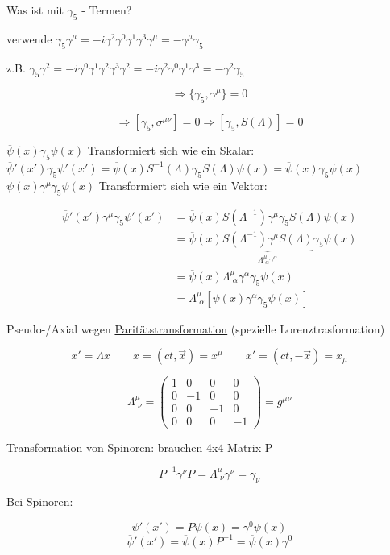 Was ist mit \(\gamma_5\) - Termen?

verwende \(\gamma_5\gamma^\mu =- i\gamma^2\gamma^0\gamma^1\gamma^3\gamma^\mu = -\gamma^\mu\gamma_5 \)

z.B. \(\gamma_5\gamma^2 = - i\gamma^0\gamma^1\gamma^2\gamma^3\gamma^2 = - i\gamma^2\gamma^0\gamma^1\gamma^3 = -\gamma^2\gamma_5 \)

\[\Rightarrow \{ \gamma_5,\gamma^\mu \} = 0\]

\[\Rightarrow [\gamma_5,\sigma^{\mu\nu}]=0 \Rightarrow [\gamma_5,S(\Lambda)]=0\]

\(\overline\psi(x)\gamma_5\psi(x) \) Transformiert sich wie ein Skalar: \(\overline\psi'(x')\gamma_5\psi'(x') = \overline\psi(x)S^{-1}(\Lambda)\gamma_5 S(\Lambda)\psi(x) = \overline\psi(x)\gamma_5 \psi(x) \)
\\
\(\overline \psi(x) \gamma^\mu\gamma_5 \psi(x) \) Transformiert sich wie ein Vektor:

\begin{align}
\overline \psi'(x') \gamma^\mu\gamma_5 \psi'(x') &= \overline \psi(x)S(\Lambda^{-1}) \gamma^\mu\gamma_5S(\Lambda)\psi(x)\\
&= \overline \psi(x)\underbrace{ S(\Lambda^{-1}) \gamma^\mu S(\Lambda)}_{ \Lambda^\mu_{\,\,\alpha}\gamma^\alpha } \gamma_5 \psi(x)\\
&= \overline \psi(x)\Lambda^\mu_{\,\,\alpha}\gamma^\alpha \gamma_5 \psi(x)\\
&=\Lambda^\mu_{\,\,\alpha}[ \overline \psi(x)\gamma^\alpha \gamma_5 \psi(x) ]
\end{align}

Pseudo-/Axial wegen \underline{Paritätstransformation} (spezielle Lorenztrasformation)

\[x' = \Lambda x \qquad x=(ct,\vec x) = x^\mu  \qquad x'=(ct,-\vec x) = x_\mu  \]

\[\Lambda^\mu_{\,\,\nu} = \begin{pmatrix} 1&0&0&0\\   0&-1&0&0\\  0&0&-1&0\\   0&0&0&-1 \end{pmatrix} = g^{\mu\nu} \]

Transformation von Spinoren: brauchen 4x4 Matrix P

\[P^{-1}\gamma^\nu P = \Lambda^\mu_{\,\,\nu}\gamma^\nu = \gamma_\nu\]


Bei Spinoren:

\[\psi'(x') = P\psi(x) = \gamma^0\psi(x) \]
\[\overline \psi'(x') = \overline\psi(x)P^{-1} = \overline \psi(x) \gamma^0 \]


